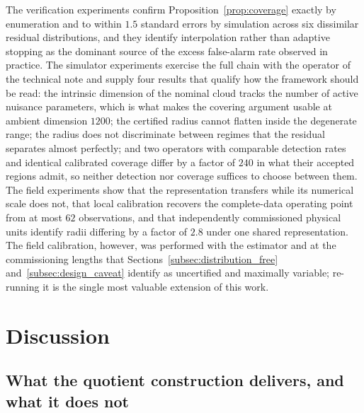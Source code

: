 \documentclass[a4paper]{cas-sc}
\begin{document}
The verification experiments confirm Proposition~\ref{prop:coverage} exactly
by enumeration and to within \(1.5\) standard errors by simulation across six
dissimilar residual distributions, and they identify interpolation rather than
adaptive stopping as the dominant source of the excess false-alarm rate
observed in practice. The simulator experiments exercise the full chain with
the operator of the technical note and supply four results that qualify how
the framework should be read: the intrinsic dimension of the nominal cloud
tracks the number of active nuisance parameters, which is what makes the
covering argument usable at ambient dimension \(1200\); the certified radius
cannot flatten inside the degenerate range; the radius does not discriminate
between regimes that the residual separates almost perfectly; and two
operators with comparable detection rates and identical calibrated coverage
differ by a factor of \(240\) in what their accepted regions admit, so
neither detection nor coverage suffices to choose between them. The field
experiments show that the representation transfers while
its numerical scale does not, that local calibration recovers the
complete-data operating point from at most \(62\) observations, and that
independently commissioned physical units identify radii differing by a factor
of \(2.8\) under one shared representation. The field calibration, however,
was performed with the estimator and at the commissioning lengths that
Sections~\ref{subsec:distribution_free} and~\ref{subsec:design_caveat}
identify as uncertified and maximally variable; re-running it is the single
most valuable extension of this work.

\section{Discussion}
\label{sec:discussion}

\subsection{What the quotient construction delivers, and what it does not}
\label{subsec:disc_yield}
\end{document}
